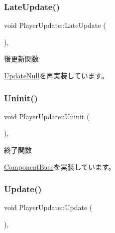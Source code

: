 \subsubsection{\texorpdfstring{Late\+Update()}{LateUpdate()}}
{\footnotesize\ttfamily void Player\+Update\+::\+Late\+Update (\begin{DoxyParamCaption}{ }\end{DoxyParamCaption})\hspace{0.3cm}{\ttfamily [override]}, {\ttfamily [virtual]}}



後更新関数 



\mbox{\hyperlink{class_update_null_ac68da1ba7f3fbcae833442bb1c169200}{Update\+Null}}を再実装しています。

\mbox{\label{class_player_update_a997e0813a825d7525da4b5b89a290168}} 
\subsubsection{\texorpdfstring{Uninit()}{Uninit()}}
{\footnotesize\ttfamily void Player\+Update\+::\+Uninit (\begin{DoxyParamCaption}{ }\end{DoxyParamCaption})\hspace{0.3cm}{\ttfamily [override]}, {\ttfamily [virtual]}}



終了関数 



\mbox{\hyperlink{class_component_base_a9f42beaf0383d6f629819579cab4de57}{Component\+Base}}を実装しています。

\mbox{\label{class_player_update_af6e1b8ca60399f232e64d2acb4968c75}} 
\subsubsection{\texorpdfstring{Update()}{Update()}}
{\footnotesize\ttfamily void Player\+Update\+::\+Update (\begin{DoxyParamCaption}{ }\end{DoxyParamCaption})\hspace{0.3cm}{\ttfamily [override]}, {\ttfamily [virtual]}}



